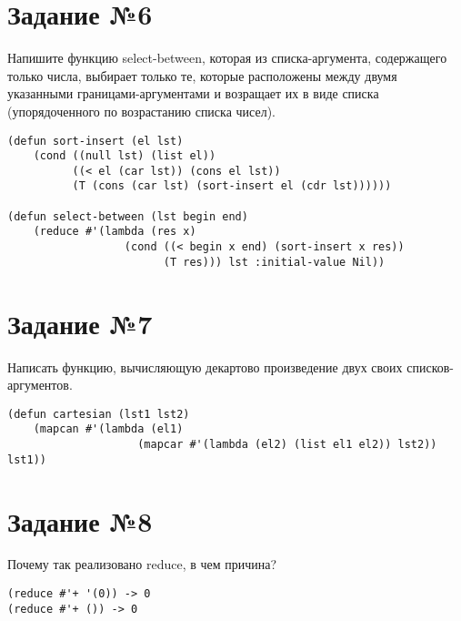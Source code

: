 \section{Задание №6}

Напишите функцию select-between, которая из списка-аргумента, содержащего
только числа, выбирает только те, которые расположены между двумя указанными
границами-аргументами и возращает их в виде списка (упорядоченного по
возрастанию списка чисел).

\vspace{4mm}
\begin{minipage}{0.92\linewidth}
\begin{lstlisting}
(defun sort-insert (el lst)
    (cond ((null lst) (list el))
          ((< el (car lst)) (cons el lst))
          (T (cons (car lst) (sort-insert el (cdr lst))))))

(defun select-between (lst begin end)
    (reduce #'(lambda (res x)
                  (cond ((< begin x end) (sort-insert x res))
                        (T res))) lst :initial-value Nil))
\end{lstlisting}
\end{minipage}

\section{Задание №7}

Написать функцию, вычисляющую декартово произведение двух своих
списков-аргументов.

\vspace{4mm}
\begin{minipage}{0.92\linewidth}
\begin{lstlisting}
(defun cartesian (lst1 lst2)
    (mapcan #'(lambda (el1)
                    (mapcar #'(lambda (el2) (list el1 el2)) lst2)) lst1))
\end{lstlisting}
\end{minipage}

\section{Задание №8}

Почему так реализовано reduce, в чем причина?

\vspace{4mm}
\begin{minipage}{0.92\linewidth}
\begin{lstlisting}
(reduce #'+ '(0)) -> 0
(reduce #'+ ()) -> 0
\end{lstlisting}
\end{minipage}

